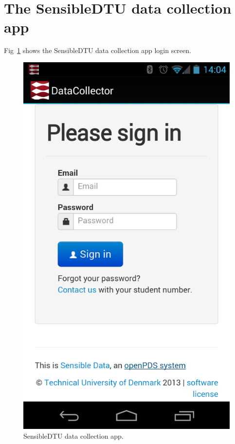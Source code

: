 \section{The SensibleDTU data collection app}

Fig~\ref{pic:sensapp} shows the SensibleDTU data collection app login screen. 

\begin{figure}[h]
	\begin{center}
		\includegraphics[scale=0.4]{figures/sensibleapp.png}
	\end{center}
	
	\caption{SensibleDTU data collection app.}
	\label{pic:sensapp}

\end{figure}